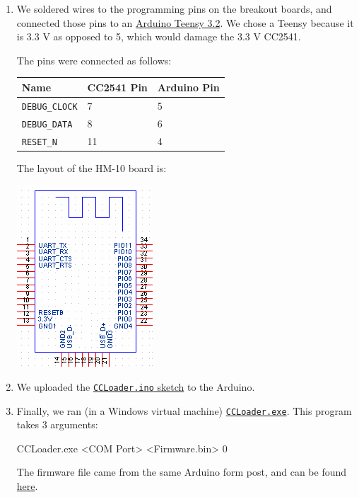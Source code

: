 \documentclass[]{article}
\newenvironment{Shaded}{}{}
\newcommand{\OperatorTok}[1]{\textcolor[rgb]{0.40,0.40,0.40}{#1}}
\newcommand{\ExtensionTok}[1]{#1}
\newcommand{\NormalTok}[1]{#1}
\begin{document}
\begin{enumerate}
\def\labelenumi{\arabic{enumi}.}
\item
  We soldered wires to the programming pins on the breakout boards, and
  connected those pins to an
  \href{https://www.pjrc.com/teensy/teensy31.html}{Arduino Teensy 3.2}.
  We chose a Teensy because it is 3.3 V as opposed to 5, which would
  damage the 3.3 V CC2541.

  The pins were connected as follows:

  \begin{longtable}[]{@{}lll@{}}
  \toprule
  Name & CC2541 Pin & Arduino Pin\tabularnewline
  \midrule
  \endhead
  \texttt{DEBUG\_CLOCK} & 7 & 5\tabularnewline
  \texttt{DEBUG\_DATA} & 8 & 6\tabularnewline
  \texttt{RESET\_N} & 11 & 4\tabularnewline
  \bottomrule
  \end{longtable}

  The layout of the HM-10 board is:

  \includegraphics{hm10_pins.png}
\item
  We uploaded the
  \href{https://github.com/RedBearLab/CCLoader/blob/master/Arduino/CCLoader/CCLoader.ino}{\texttt{CCLoader.ino}
  sketch} to the Arduino.
\item
  Finally, we ran (in a Windows virtual machine)
  \href{https://github.com/RedBearLab/CCLoader/tree/master/Windows}{\texttt{CCLoader.exe}}.
  This program takes 3 arguments:

\begin{Shaded}
\begin{Highlighting}[]
\ExtensionTok{CCLoader.exe} \OperatorTok{<}\NormalTok{COM Port}\OperatorTok{>} \OperatorTok{<}\NormalTok{Firmware.bin}\OperatorTok{>}\NormalTok{ 0}
\end{Highlighting}
\end{Shaded}

  The firmware file came from the same Arduino form post, and can be
  found
  \href{http://forum.arduino.cc/index.php?action=dlattach;topic=393655.0;attach=183702}{here}.
\end{enumerate}
\end{document}
